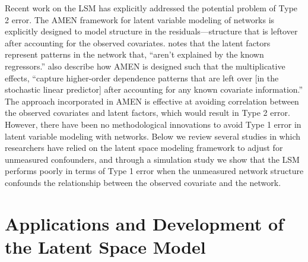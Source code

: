 \documentclass[11pt]{article}
\begin{document}
Recent work on the LSM has explicitly addressed the potential problem of Type 2 error. The AMEN framework for latent variable modeling of networks is explicitly designed to model structure in the residuals---structure that is leftover after accounting for the observed covariates. \citet[p. 43]{hoff2015dyadic} notes that the latent factors represent patterns in the network that, ``aren't explained by the known regressors.'' \citet[pp. 12--13]{minhas2016inferential} also describe how AMEN is designed such that the multiplicative effects, ``capture higher-order dependence patterns that are left over [in the stochastic linear predictor] after accounting for any known covariate information.''  The approach incorporated in AMEN is effective at avoiding correlation between the observed covariates and latent factors, which would result in Type 2 error. However, there have been no methodological innovations to avoid Type 1 error in latent variable modeling with networks. Below we review several studies in which researchers have relied on the latent space modeling framework to adjust for unmeasured confounders, and through a simulation study we show that the LSM performs poorly in terms of Type 1 error when the unmeasured network structure confounds the relationship between the observed covariate and the network.


\section{Applications and Development of the Latent Space Model}
\end{document}
